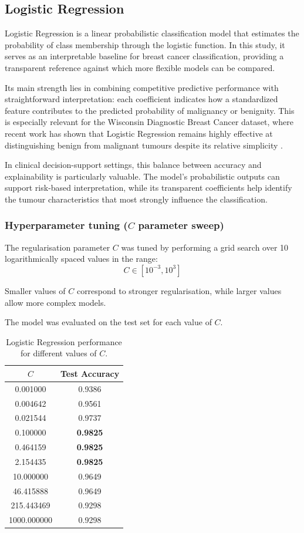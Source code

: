 \documentclass[twocolumn, fontsize=10pt]{article}
\begin{document}
\subsection{Logistic Regression}
\label{sec:lr}

Logistic Regression is a linear probabilistic classification model that estimates the probability of class membership through the logistic function. In this study, it serves as an interpretable baseline for breast cancer classification, providing a transparent reference against which more flexible models can be compared.

Its main strength lies in combining competitive predictive performance with straightforward interpretation: each coefficient indicates how a standardized feature contributes to the predicted probability of malignancy or benignity. This is especially relevant for the Wisconsin Diagnostic Breast Cancer dataset, where recent work has shown that Logistic Regression remains highly effective at distinguishing benign from malignant tumours despite its relative simplicity \citep{cheng2025lr}.

In clinical decision-support settings, this balance between accuracy and explainability is particularly valuable. The model's probabilistic outputs can support risk-based interpretation, while its transparent coefficients help identify the tumour characteristics that most strongly influence the classification.

\subsubsection{Hyperparameter tuning ($C$ parameter sweep)}

The regularisation parameter $C$ was tuned by performing a grid search over 10 logarithmically spaced values in the range:
\[
C \in [10^{-3}, 10^{3}]
\]

Smaller values of $C$ correspond to stronger regularisation, while larger values allow more complex models.

The model was evaluated on the test set for each value of $C$.


\begin{table}[H]
\centering
\small
\setlength{\tabcolsep}{4pt}
\begin{tabular}{cc}
\toprule
$C$ & Test Accuracy \\
\midrule
0.001000 & 0.9386 \\
0.004642 & 0.9561 \\
0.021544 & 0.9737 \\
0.100000 & \textbf{0.9825} \\
0.464159 & \textbf{0.9825} \\
2.154435 & \textbf{0.9825} \\
10.000000 & 0.9649 \\
46.415888 & 0.9649 \\
215.443469 & 0.9298 \\
1000.000000 & 0.9298 \\
\bottomrule
\end{tabular}
\caption{Logistic Regression performance for different values of $C$.}
\label{tab:lr_c_sweep}
\end{table}
\end{document}
